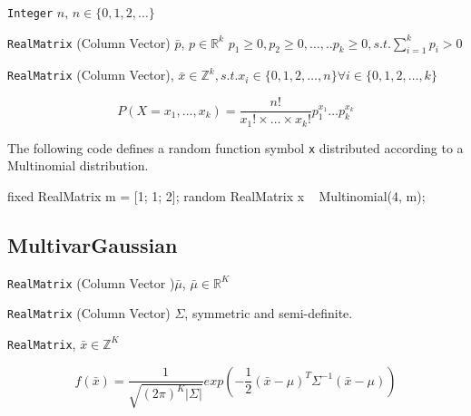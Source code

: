 \begin{itemize*}
\item[] \verb|Integer| $n$, $n \in \{0, 1, 2, \ldots \}$
\item[] \verb|RealMatrix| (Column Vector) $\bar{p}$, $p \in \mathbb{R}^{k}$ $p_{1} \geq 0, p_{2} \geq 0, \ldots, .. p_{k} \geq 0, s.t. \sum_{i=1}^{k} p_{i} > 0$
\end{itemize*}

\begin{itemize*}
\item[] \verb|RealMatrix| (Column Vector), $\bar{x} \in \mathbb{Z}^{k}, s.t. x_{i} \in \{0, 1, 2, \ldots, n \} \forall i \in \{0, 1, 2, \ldots, k \}  $ 
\end{itemize*}

\[
	P(X = x_{1},\ldots,x_{k}) = \frac{n!}{x_{1}! \times \ldots \times x_{k}!} p_{1}^{x_{1}} \ldots p_{k}^{x_{k}}
\]

The following code defines a random function symbol \verb|x| distributed according to a Multinomial distribution.
\begin{blogcode}
fixed RealMatrix m = [1; 1; 2];
random RealMatrix x ~ Multinomial(4, m);
\end{blogcode}

\subsection{MultivarGaussian}

\begin{itemize*}
\item[] \verb|RealMatrix| (Column Vector )$\bar{\mu}$, $\bar{\mu} \in \mathbb{R}^{K}$

\item[] \verb|RealMatrix| (Column Vector) $\Sigma$, symmetric and semi-definite.

\end{itemize*}

\begin{itemize*}
\item[] \verb|RealMatrix|, $\bar{x} \in \mathbb{Z}^{K} $ 
\end{itemize*}

\[
f(\bar{x}) = \frac{1}{\sqrt{(2\pi)^{K}|\Sigma|}}exp(-\frac{1}{2} (\bar{x} - \mu)^{T}\Sigma^{-1}(\bar{x} - \mu))
\]

